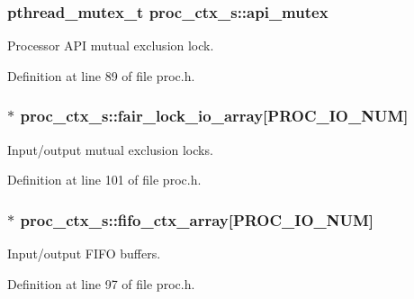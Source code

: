 \subsubsection[{\texorpdfstring{api\+\_\+mutex}{api_mutex}}]{\setlength{\rightskip}{0pt plus 5cm}pthread\+\_\+mutex\+\_\+t proc\+\_\+ctx\+\_\+s\+::api\+\_\+mutex}\hypertarget{structproc__ctx__s_aea90c57d9b0a303b638a51ce7efa9a1e}{}\label{structproc__ctx__s_aea90c57d9b0a303b638a51ce7efa9a1e}
Processor A\+PI mutual exclusion lock. 

Definition at line 89 of file proc.\+h.

\subsubsection[{\texorpdfstring{fair\+\_\+lock\+\_\+io\+\_\+array}{fair_lock_io_array}}]{$\ast$ proc\+\_\+ctx\+\_\+s\+::fair\+\_\+lock\+\_\+io\+\_\+array\mbox{[}P\+R\+O\+C\+\_\+\+I\+O\+\_\+\+N\+UM\mbox{]}}\hypertarget{structproc__ctx__s_a6529e1ba97566c429d658e121bb604bb}{}\label{structproc__ctx__s_a6529e1ba97566c429d658e121bb604bb}
Input/output mutual exclusion locks. 

Definition at line 101 of file proc.\+h.

\subsubsection[{\texorpdfstring{fifo\+\_\+ctx\+\_\+array}{fifo_ctx_array}}]{$\ast$ proc\+\_\+ctx\+\_\+s\+::fifo\+\_\+ctx\+\_\+array\mbox{[}P\+R\+O\+C\+\_\+\+I\+O\+\_\+\+N\+UM\mbox{]}}\hypertarget{structproc__ctx__s_a3b71d039235f439a87d9ec7d7b5b5549}{}\label{structproc__ctx__s_a3b71d039235f439a87d9ec7d7b5b5549}
Input/output F\+I\+FO buffers. 

Definition at line 97 of file proc.\+h.


